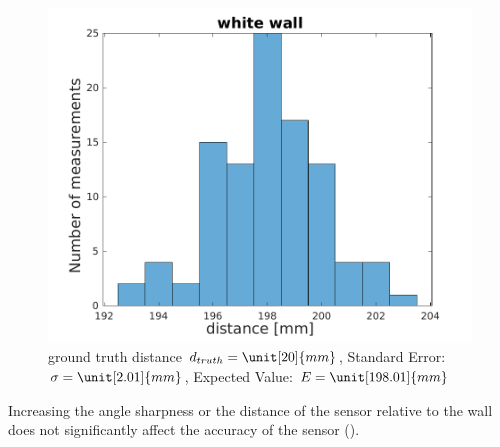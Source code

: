 \begin{figure}
\begin{minipage}{0.8\textwidth}
		\includegraphics[width=0.9\linewidth]{pictures/white_wall.pdf}
		\caption{ground truth distance $d_{truth}= \unit[20]{mm}$, Standard Error: $\sigma=\unit[2.01]{mm}$, Expected Value: $E=\unit[198.01]{mm}$}
		\label{fig:surface_hist_white1}
	\end{minipage}
\end{figure}

Increasing the angle sharpness or the distance of the sensor relative to the wall does not significantly affect the accuracy of the sensor ().\\

